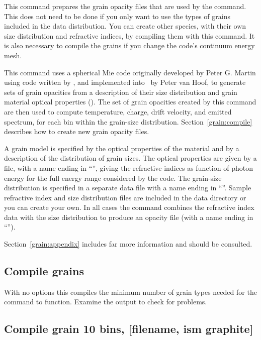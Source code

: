 This command prepares the grain opacity files that are used by the
 command.
This does not need to be done if you only want to use
the types of grains included in the data distribution.
You can create other species, with their own size
distribution and refractive indices, by compiling them with this command.
It is also necessary to compile the grains if you change the code's
continuum energy mesh.

This command uses a spherical Mie code originally developed by Peter
G. Martin using code written by \citet{Hansen1974}, and implemented
into \Cloudy\ by Peter van Hoof, to generate sets of grain opacities from
a description of their size distribution and grain material optical
properties (\citealp{VanHoof2004}).
The set of grain opacities created by
this  command are then used to
compute temperature, charge, drift
velocity, and emitted spectrum, for each bin within the
grain-size distribution.
Section~\ref{grain:compile} describes how to create new grain opacity files.

A grain model is specified by the optical properties of the material
and by a description of the distribution of grain sizes.
The optical
properties are given by a file, with a name ending in ``'',
giving the
refractive indices as function of photon energy for the full energy range
considered by the code.
The grain-size distribution is specified in a
separate data file with a name ending in ``''.
Sample refractive index
and size distribution files are included in the data directory or you can
create your own.
In all cases the  command combines the refractive
index data with the size distribution to produce an opacity file
(with a name ending in ``'').

Section~\ref{grain:appendix} includes far
more information and should be consulted.

\subsection{Compile grains}

With no options this compiles the minimum number of grain types needed
for the  command to function.
Examine the output to check
for problems.

\subsection{Compile grain 10 bins, [filename, ism graphite]}

